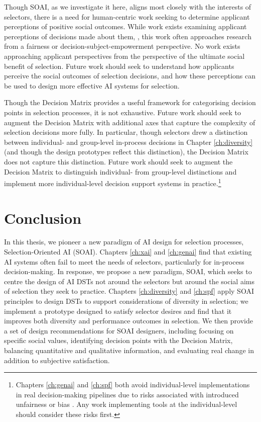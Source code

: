 Though SOAI, as we investigate it here, aligns most closely with the interests of selectors, there is a need for human-centric work seeking to determine applicant perceptions of positive social outcomes. While work exists examining applicant perceptions of decisions made about them, \cite{pandey_applicants_2022,horodyski_applicants_2023}, this work often approaches research from a fairness or decision-subject-empowerment perspective. No work exists approaching applicant perspectives from the perspective of the ultimate social benefit of selection. Future work should seek to understand how applicants perceive the social outcomes of selection decisions, and how these perceptions can be used to design more effective AI systems for selection.

Though the Decision Matrix provides a useful framework for categorising decision points in selection processes, it is not exhaustive. Future work should seek to augment the Decision Matrix with additional axes that capture the complexity of selection decisions more fully. In particular, though selectors drew a distinction between individual- and group-level in-process decisions in Chapter \ref{ch:diversity} (and though the design prototypes reflect this distinction), the Decision Matrix does not capture this distinction. Future work should seek to augment the Decision Matrix to distinguish individual- from group-level distinctions and implement more individual-level decision support systems in practice.\footnote{Chapters \ref{ch:genai} and \ref{ch:spf} both avoid individual-level implementations in real decision-making pipelines due to risks associated with introduced unfairness or bias \cite{hartigan_fairness_1989,barocas2023fairness,pmlr-v80-kearns18a,Bastounis_Campodonico_vanderSchaar_Adcock_Hansen_2024,liang_gpt_2023}. Any work implementing tools at the individual-level should consider these risks first.}

\section{Conclusion}
In this thesis, we pioneer a new paradigm of AI design for selection processes, Selection-Oriented AI (SOAI). Chapters \ref{ch:xai} and \ref{ch:genai} find that existing AI systems often fail to meet the needs of selectors, particularly for in-process decision-making. In response, we propose a new paradigm, SOAI, which seeks to centre the design of AI DSTs not around the selectors but around the social aims of selection they seek to practice. Chapters \ref{ch:diversity} and \ref{ch:spf} apply SOAI principles to design DSTs to support considerations of diversity in selection; we implement a prototype designed to satisfy selector desires and find that it improves both diversity and performance outcomes in selection. We then provide a set of design recommendations for SOAI designers, including focusing on specific social values, identifying decision points with the Decision Matrix, balancing quantitative and qualitative information, and evaluating real change in addition to subjective satisfaction.

